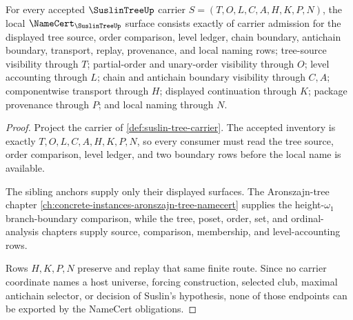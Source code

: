 \begin{theorem}
\label{thm:suslin-tree-namecert-obligations}
For every accepted $\SuslinTreeUp$ carrier $S=(T,O,L,C,A,H,K,P,N)$, the local $\NameCert_{\SuslinTreeUp}$ surface consists exactly of carrier admission for the displayed tree source, order comparison, level ledger, chain boundary, antichain boundary, transport, replay, provenance, and local naming rows; tree-source visibility through $T$; partial-order and unary-order visibility through $O$; level accounting through $L$; chain and antichain boundary visibility through $C,A$; componentwise transport through $H$; displayed continuation through $K$; package provenance through $P$; and local naming through $N$.
\end{theorem}
\begin{proof}
Project the carrier of \autoref{def:suslin-tree-carrier}. The accepted inventory is exactly $T,O,L,C,A,H,K,P,N$, so every consumer must read the tree source, order comparison, level ledger, and two boundary rows before the local name is available.

The sibling anchors supply only their displayed surfaces. The Aronszajn-tree chapter \autoref{ch:concrete-instances-aronszajn-tree-namecert} supplies the height-$\omega_1$ branch-boundary comparison, while the tree, poset, order, set, and ordinal-analysis chapters supply source, comparison, membership, and level-accounting rows.

Rows $H,K,P,N$ preserve and replay that same finite route. Since no carrier coordinate names a host universe, forcing construction, selected club, maximal antichain selector, or decision of Suslin's hypothesis, none of those endpoints can be exported by the NameCert obligations.
\end{proof}

